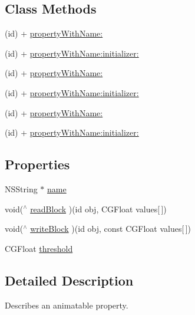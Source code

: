 \subsection*{Class Methods}
\begin{DoxyCompactItemize}
\item 
(id) + \mbox{\hyperlink{interface_p_o_p_animatable_property_ad11b0dd7ba703f4ba087052ce57c12b4}{property\+With\+Name\+:}}
\item 
(id) + \mbox{\hyperlink{interface_p_o_p_animatable_property_aad3690254419e0353ebfa982a22d8c6e}{property\+With\+Name\+:initializer\+:}}
\item 
(id) + \mbox{\hyperlink{interface_p_o_p_animatable_property_ad11b0dd7ba703f4ba087052ce57c12b4}{property\+With\+Name\+:}}
\item 
(id) + \mbox{\hyperlink{interface_p_o_p_animatable_property_aad3690254419e0353ebfa982a22d8c6e}{property\+With\+Name\+:initializer\+:}}
\item 
(id) + \mbox{\hyperlink{interface_p_o_p_animatable_property_ad11b0dd7ba703f4ba087052ce57c12b4}{property\+With\+Name\+:}}
\item 
(id) + \mbox{\hyperlink{interface_p_o_p_animatable_property_aad3690254419e0353ebfa982a22d8c6e}{property\+With\+Name\+:initializer\+:}}
\end{DoxyCompactItemize}
\subsection*{Properties}
\begin{DoxyCompactItemize}
\item 
N\+S\+String $\ast$ \mbox{\hyperlink{interface_p_o_p_animatable_property_ad25f3a991be42865b55410a5cccda057}{name}}
\item 
void($^\wedge$ \mbox{\hyperlink{interface_p_o_p_animatable_property_a5e1eae2bfb657c1a09f0069514fbed90}{read\+Block}} )(id obj, C\+G\+Float values\mbox{[}$\,$\mbox{]})
\item 
void($^\wedge$ \mbox{\hyperlink{interface_p_o_p_animatable_property_a60e716c4e3d0b927ed742aab961d9898}{write\+Block}} )(id obj, const C\+G\+Float values\mbox{[}$\,$\mbox{]})
\item 
C\+G\+Float \mbox{\hyperlink{interface_p_o_p_animatable_property_a018afd207a81734b9ff792fe421d0a8d}{threshold}}
\end{DoxyCompactItemize}


\subsection{Detailed Description}
Describes an animatable property.

